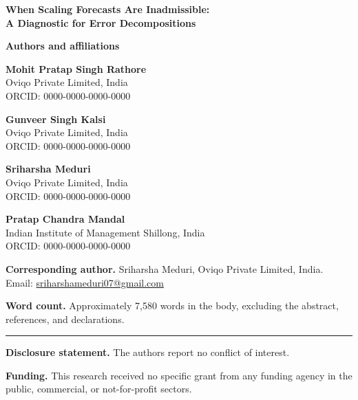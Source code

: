 \documentclass[11pt]{article}
\begin{document}
\begin{center}
{\LARGE\bf When Scaling Forecasts Are Inadmissible:\\[0.3em]
A Diagnostic for Error Decompositions}
\end{center}

\vspace{1.5em}

\noindent\textbf{Authors and affiliations}

\vspace{0.6em}
\noindent\textbf{Mohit Pratap Singh Rathore}\\
Oviqo Private Limited, India\\
ORCID: 0000-0000-0000-0000

\vspace{0.6em}
\noindent\textbf{Gunveer Singh Kalsi}\\
Oviqo Private Limited, India\\
ORCID: 0000-0000-0000-0000

\vspace{0.6em}
\noindent\textbf{Sriharsha Meduri}\\
Oviqo Private Limited, India\\
ORCID: 0000-0000-0000-0000

\vspace{0.6em}
\noindent\textbf{Pratap Chandra Mandal}\\
Indian Institute of Management Shillong, India\\
ORCID: 0000-0000-0000-0000

\vspace{1.2em}
\noindent\textbf{Corresponding author.} Sriharsha Meduri, Oviqo Private Limited,
India. Email: \href{mailto:sriharshameduri07@gmail.com}{sriharshameduri07@gmail.com}

\vspace{1.2em}
\noindent\textbf{Word count.} Approximately 7{,}580 words in the body, excluding
the abstract, references, and declarations.

\vspace{2em}
\noindent\rule{\linewidth}{0.4pt}

\vspace{1em}

\vspace{0.8em}
\noindent\textbf{Disclosure statement.} The authors report no conflict of interest.

\vspace{0.6em}
\noindent\textbf{Funding.} This research received no specific grant from any funding
agency in the public, commercial, or not-for-profit sectors.
\end{document}
